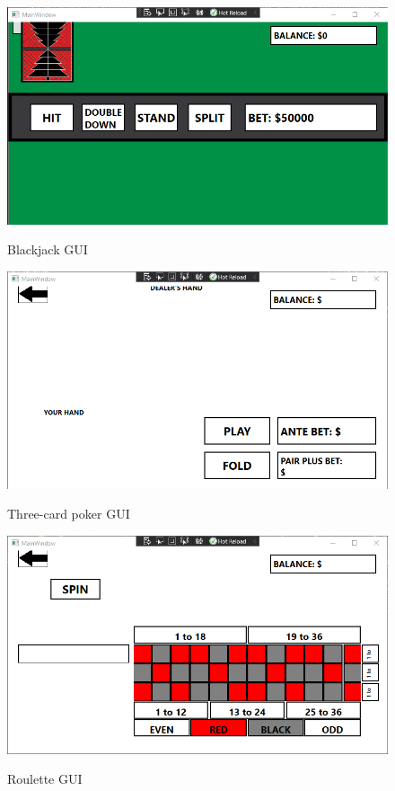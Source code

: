 \documentclass[10pt,conference,onecolumn,compsoc]{IEEEtran}
\begin{document}
\newpage

\begin{figure}[h]
\caption{Blackjack GUI}
\includegraphics[scale=0.4]{Black_jack}
\label{fig:blackjack}
\centering
\end{figure}

\newpage

\begin{figure}[h]
\caption{Three-card poker GUI}
\includegraphics[scale=0.4]{Three}
\label{fig:three-card}
\centering
\end{figure}

\begin{figure}[h]
\caption{Roulette GUI}
\includegraphics[scale=0.4]{Roullete}
\label{fig:roulette}
\centering
\end{figure}
\end{document}
